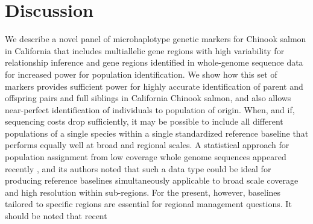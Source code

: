 \section*{Discussion}

We describe a novel panel of microhaplotype genetic markers for Chinook salmon 
in California that includes multiallelic gene regions with high variability for 
relationship inference and gene regions identified in whole-genome sequence data 
for increased power for population identification. We show how this set of markers
provides sufficient power for highly accurate identification of parent and offspring
pairs and full siblings in California Chinook salmon, and also allows near-perfect 
identification of individuals to population of origin. 
When, and if, sequencing costs drop sufficiently, it may be possible to include
all different populations of a single species within a single standardized reference baseline
that performs equally well at broad and regional scales. A statistical approach for population
assignment from low coverage whole genome sequences appeared recently
\citep{desaixINPRESSpopulation}, and its authors noted that such a data type could
be ideal for producing reference baselines simultaneously applicable to broad scale
coverage and high resolution within sub-regions.   For the present, however,
baselines tailored to specific regions are essential for regional management questions.
It should be noted that recent 

